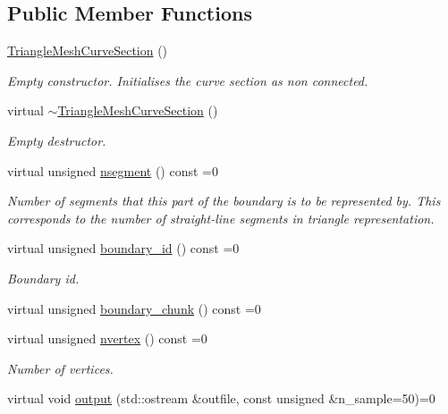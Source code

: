 \subsection*{Public Member Functions}
\begin{DoxyCompactItemize}
\item 
\hyperlink{classoomph_1_1TriangleMeshCurveSection_a7ea6757c0c67d0b225f33f137cf4c98d}{Triangle\+Mesh\+Curve\+Section} ()
\begin{DoxyCompactList}\small\item\em Empty constructor. Initialises the curve section as non connected. \end{DoxyCompactList}\item 
virtual \hyperlink{classoomph_1_1TriangleMeshCurveSection_a4d723c6ea8d102f865e26d8362e9ad92}{$\sim$\+Triangle\+Mesh\+Curve\+Section} ()
\begin{DoxyCompactList}\small\item\em Empty destructor. \end{DoxyCompactList}\item 
virtual unsigned \hyperlink{classoomph_1_1TriangleMeshCurveSection_a52af59a9a4f1b6adb35e5645ab8feb45}{nsegment} () const =0
\begin{DoxyCompactList}\small\item\em Number of segments that this part of the boundary is to be represented by. This corresponds to the number of straight-\/line segments in triangle representation. \end{DoxyCompactList}\item 
virtual unsigned \hyperlink{classoomph_1_1TriangleMeshCurveSection_a2e6d22017ce7abe7e84e3f16360f5444}{boundary\+\_\+id} () const =0
\begin{DoxyCompactList}\small\item\em Boundary id. \end{DoxyCompactList}\item 
virtual unsigned \hyperlink{classoomph_1_1TriangleMeshCurveSection_a106d1f0e203e8e17c8296419be284c16}{boundary\+\_\+chunk} () const =0
\item 
virtual unsigned \hyperlink{classoomph_1_1TriangleMeshCurveSection_a491d849e8147152c10d55c8ca6c3d63d}{nvertex} () const =0
\begin{DoxyCompactList}\small\item\em Number of vertices. \end{DoxyCompactList}\item 
virtual void \hyperlink{classoomph_1_1TriangleMeshCurveSection_a140b0bb85d7bf85cc025e19e996d5c53}{output} (std\+::ostream \&outfile, const unsigned \&n\+\_\+sample=50)=0

\end{DoxyCompactItemize}
